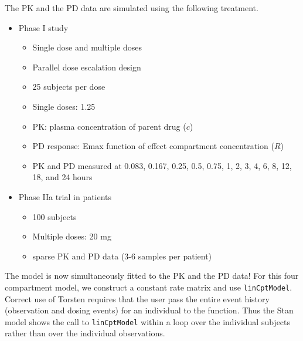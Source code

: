 \documentclass[11pt]{amsart}
\begin{document}
The PK and the PD data are simulated using the following treatment.
\begin{itemize}
  \item Phase I study
  \begin{itemize}
    \item Single dose and multiple doses
    \item Parallel dose escalation design
    \item 25 subjects per dose
    \item Single doses: 1.25 
    \item PK: plasma concentration of parent drug ($c$)
    \item PD response: Emax function of effect compartment concentration ($R$)
    \item PK and PD measured at 0.083, 0.167, 0.25, 0.5, 0.75, 1, 2, 3, 4, 6, 8, 12, 18, and 24 hours
  \end{itemize}
  \item Phase IIa trial in patients
  \begin{itemize}
    \item 100 subjects
    \item Multiple doses: 20 mg
    \item sparse PK and PD data (3-6 samples per patient)
  \end{itemize}
\end{itemize}

The model is now simultaneously fitted to the PK and the PD data! For this four compartment model, we construct a constant rate matrix and use \texttt{linCptModel}. Correct use of Torsten requires that the user pass the entire event history (observation and dosing events) for an individual to the function. Thus the Stan model shows the call to \texttt{linCptModel} within a loop over the individual subjects rather than over the individual observations.
\end{document}
